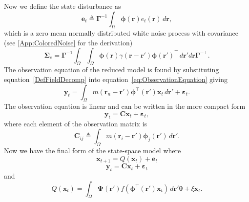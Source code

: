 \documentclass[5p,authoryear]{elsarticle}
\begin{document}
Now we define the state disturbance as
\begin{equation}\label{eq:Wt} 
	\mathbf{e}_t \triangleq \boldsymbol{\Gamma}^{-1}\int_\Omega {\boldsymbol{\phi} ( \mathbf{r} )e_t( \mathbf{r} ) \, d\mathbf{r}},
\end{equation}
which is a zero mean normally distributed white noise process with covariance (see \ref{App:ColoredNoise} for the derivation)
\begin{equation}
	\boldsymbol\Sigma_e =\mathbf{\Gamma}^{-1}\int_{\Omega}\int_{\Omega}\boldsymbol{\phi}\left(\mathbf r\right) \gamma\left(\mathbf r- \mathbf r' \right)\boldsymbol{\phi}\left(\mathbf r'\right)^{\top} \, d\mathbf r' d\mathbf r\mathbf{\Gamma}^{- \top}. 
\end{equation}
The observation equation of the reduced model is found by substituting equation~\ref{DefFieldDecomp} into equation~\ref{eq:ObservationEquation} giving
\begin{equation}\label{eq:ReducedObservationEquation}
	\mathbf{y}_t = \int_{\Omega}{m\left(\mathbf{r}_n-\mathbf{r}'\right)\boldsymbol{\phi}^{\top}\left(\mathbf{r'}\right) \mathbf{x}_t\, d\mathbf{r}'} + \boldsymbol{\varepsilon}_t. 
\end{equation}
The observation equation is linear and can be written in the more compact form
\begin{equation}\label{ObservationEquation} 
	\mathbf{y}_t = \mathbf{C}\mathbf{x}_t + \boldsymbol{\varepsilon}_t,
\end{equation}
where each element of the observation matrix is 
\begin{equation}
	\mathbf{C}_{ij} \triangleq \int_{\Omega}m(\mathbf{r}_i - \mathbf{r}')\boldsymbol{\phi}_j(\mathbf{r}') \, d\mathbf{r}'.
\end{equation}
Now we have the final form of the state-space model where
\begin{equation}\label{eq:finalformstatespacemodel}
	\mathbf{x}_{t+1} = Q(\mathbf{x}_t) +\mathbf{e}_t
\end{equation}
\begin{equation} 
	\mathbf{y}_t = \mathbf{C}\mathbf{x}_t + \boldsymbol{\varepsilon}_t
\end{equation}
and 
\begin{equation}\label{eq:QmatrixForSigmapoints}
	Q(\mathbf{x}_t) = \int_\Omega \boldsymbol{\Psi}(\mathbf{r}') f(\boldsymbol{\phi}^{\top}(\mathbf{r}')\mathbf{x}_t) \, d\mathbf{r}' \boldsymbol{\theta} + \xi\mathbf{x}_t.
\end{equation}
\end{document}
